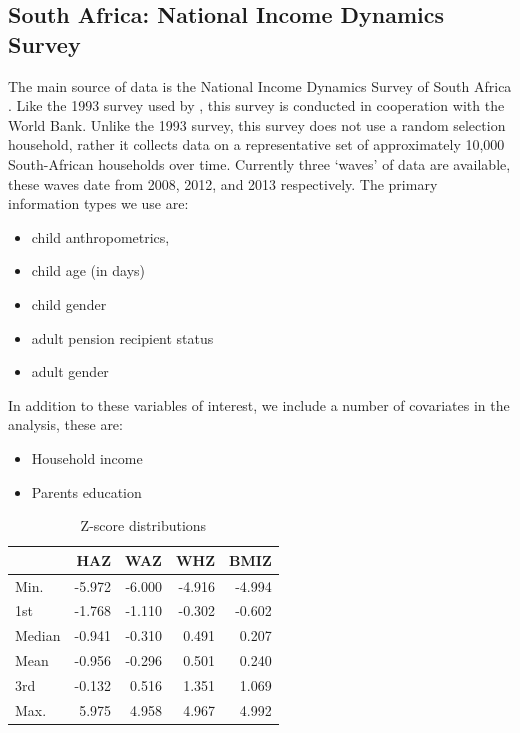 \begin{refsection}
\subsection{South Africa: National Income Dynamics Survey}
The main source of data is the National Income Dynamics Survey of South Africa \parencite{saldru2008nids, saldru2012nids, saldru2013nids}.
Like the 1993 survey used by \textcite{duflo2000child, duflo2003grandmothers}, this survey is conducted in cooperation with the World Bank.
Unlike the 1993 survey, this survey does not use a random selection household,
rather it collects data on a representative set of approximately 10,000 South-African households over time.
Currently three `waves' of data are available, these waves date from 2008, 2012, and 2013 respectively.
The primary information types we use are:
\begin{itemize}
  \item child anthropometrics,
  \item child age (in days)
  \item child gender
  \item adult pension recipient status
  \item adult gender
\end{itemize}
In addition to these variables of interest, we include a number of covariates in the analysis, these are:
\begin{itemize}
  \item Household income
  \item Parents education
\end{itemize}

\begin{table}[hb!]
\centering
\caption{Z-score distributions}
\label{sa:ta:zscore}
    \begin{tabular}{l|rrrr}
    \hline
    & HAZ & WAZ & WHZ & BMIZ\\
    \hline
    Min.   & -5.972 & -6.000  & -4.916 & -4.994 \\
    1st    & -1.768 & -1.110  & -0.302 & -0.602 \\
    Median & -0.941 & -0.310  &  0.491  & 0.207  \\
    Mean   & -0.956 & -0.296  &  0.501  & 0.240   \\
    3rd    & -0.132 &  0.516  &  1.351  & 1.069  \\
    Max.   &  5.975 &  4.958  &  4.967  & 4.992  \\
    \end{tabular}
\end{table}


\end{refsection}
